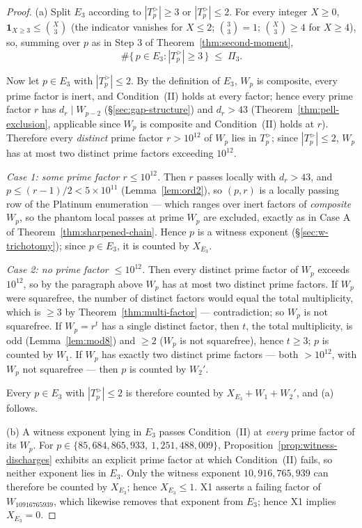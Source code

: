 \documentclass[11pt]{amsart}
\theoremstyle{plain}
\theoremstyle{definition}
\theoremstyle{remark}
\numberwithin{equation}{section}
\begin{document}
\begin{proof}
(a) Split $E_3$ according to $|T_p^{>}| \geq 3$ or $|T_p^{>}| \leq 2$. For every integer $X \geq 0$, $\mathbf{1}_{X \geq 3} \leq \binom{X}{3}$ (the indicator vanishes for $X \leq 2$; $\binom{3}{3} = 1$; $\binom{X}{3} \geq 4$ for $X \geq 4$), so, summing over $p$ as in Step 3 of Theorem~\ref{thm:second-moment},
\[
  \#\{\,p \in E_3 : |T_p^{>}| \geq 3\,\} \;\leq\; \Pi_3.
\]

Now let $p \in E_3$ with $|T_p^{>}| \leq 2$. By the definition of $E_3$, $W_p$ is composite, every prime factor is inert, and Condition~(II) holds at every factor; hence every prime factor $r$ has $d_r \mid W_{p-2}$ (\S\ref{sec:gap-structure}) and $d_r > 43$ (Theorem~\ref{thm:pell-exclusion}, applicable since $W_p$ is composite and Condition~(II) holds at $r$). Therefore every \emph{distinct} prime factor $r > 10^{12}$ of $W_p$ lies in $T_p^{>}$; since $|T_p^{>}| \leq 2$, $W_p$ has at most two distinct prime factors exceeding $10^{12}$.

\emph{Case 1: some prime factor $r \leq 10^{12}$.} Then $r$ passes locally with $d_r > 43$, and $p \leq (r-1)/2 < 5 \times 10^{11}$ (Lemma~\ref{lem:ord2}), so $(p, r)$ is a locally passing row of the Platinum enumeration --- which ranges over inert factors of \emph{composite} $W_p$, so the phantom local passes at prime $W_p$ are excluded, exactly as in Case A of Theorem~\ref{thm:sharpened-chain}. Hence $p$ is a witness exponent (\S\ref{sec:w-trichotomy}); since $p \in E_3$, it is counted by $X_{E_3}$.

\emph{Case 2: no prime factor $\leq 10^{12}$.} Then every distinct prime factor of $W_p$ exceeds $10^{12}$, so by the paragraph above $W_p$ has at most two distinct prime factors. If $W_p$ were squarefree, the number of distinct factors would equal the total multiplicity, which is $\geq 3$ by Theorem~\ref{thm:multi-factor} --- contradiction; so $W_p$ is not squarefree. If $W_p = r^t$ has a single distinct factor, then $t$, the total multiplicity, is odd (Lemma~\ref{lem:mod8}) and $\geq 2$ ($W_p$ is not squarefree), hence $t \geq 3$; $p$ is counted by $W_1$. If $W_p$ has exactly two distinct prime factors --- both $> 10^{12}$, with $W_p$ not squarefree --- then $p$ is counted by $W_2'$.

Every $p \in E_3$ with $|T_p^{>}| \leq 2$ is therefore counted by $X_{E_3} + W_1 + W_2'$, and (a) follows.

(b) A witness exponent lying in $E_3$ passes Condition~(II) at \emph{every} prime factor of its $W_p$. For $p \in \{85{,}684{,}865{,}933,\ 1{,}251{,}488{,}009\}$, Proposition~\ref{prop:witness-discharges} exhibits an explicit prime factor at which Condition~(II) fails, so neither exponent lies in $E_3$. Only the witness exponent $10{,}916{,}765{,}939$ can therefore be counted by $X_{E_3}$; hence $X_{E_3} \leq 1$. X1 asserts a failing factor of $W_{10916765939}$, which likewise removes that exponent from $E_3$; hence X1 implies $X_{E_3} = 0$.


\end{proof}
\end{document}
